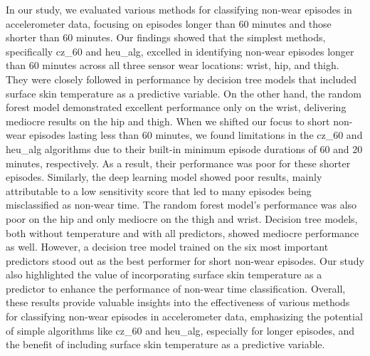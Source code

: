 \documentclass[
  10pt,
]{scrbook}
\begin{document}
In our study, we evaluated various methods for classifying non-wear
episodes in accelerometer data, focusing on episodes longer than 60
minutes and those shorter than 60 minutes. Our findings showed that the
simplest methods, specifically cz\_60 and heu\_alg, excelled in
identifying non-wear episodes longer than 60 minutes across all three
sensor wear locations: wrist, hip, and thigh. They were closely followed
in performance by decision tree models that included surface skin
temperature as a predictive variable. On the other hand, the random
forest model demonstrated excellent performance only on the wrist,
delivering mediocre results on the hip and thigh. When we shifted our
focus to short non-wear episodes lasting less than 60 minutes, we found
limitations in the cz\_60 and heu\_alg algorithms due to their built-in
minimum episode durations of 60 and 20 minutes, respectively. As a
result, their performance was poor for these shorter episodes.
Similarly, the deep learning model showed poor results, mainly
attributable to a low sensitivity score that led to many episodes being
misclassified as non-wear time. The random forest model's performance
was also poor on the hip and only mediocre on the thigh and wrist.
Decision tree models, both without temperature and with all predictors,
showed mediocre performance as well. However, a decision tree model
trained on the six most important predictors stood out as the best
performer for short non-wear episodes. Our study also highlighted the
value of incorporating surface skin temperature as a predictor to
enhance the performance of non-wear time classification. Overall, these
results provide valuable insights into the effectiveness of various
methods for classifying non-wear episodes in accelerometer data,
emphasizing the potential of simple algorithms like cz\_60 and heu\_alg,
especially for longer episodes, and the benefit of including surface
skin temperature as a predictive variable.
\end{document}
